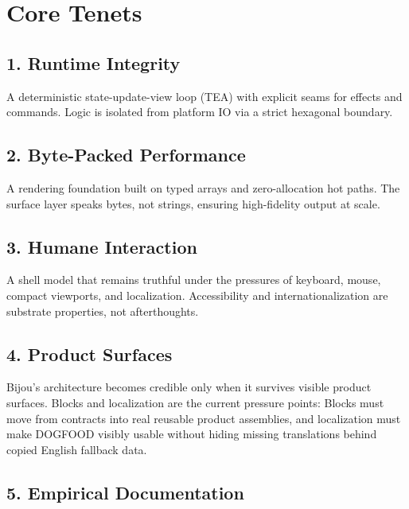 \section{Core Tenets}\label{record-031-core-tenets}

\subsection{1. Runtime Integrity}\label{record-031-runtime-integrity}

A deterministic state-update-view loop (TEA) with explicit seams for effects and commands. Logic is isolated from platform IO via a strict hexagonal boundary.

\subsection{2. Byte-Packed Performance}\label{record-031-byte-packed-performance}

A rendering foundation built on typed arrays and zero-allocation hot paths. The surface layer speaks bytes, not strings, ensuring high-fidelity output at scale.

\subsection{3. Humane Interaction}\label{record-031-humane-interaction}

A shell model that remains truthful under the pressures of keyboard, mouse, compact viewports, and localization. Accessibility and internationalization are substrate properties, not afterthoughts.

\subsection{4. Product Surfaces}\label{record-031-product-surfaces}

Bijou's architecture becomes credible only when it survives visible product surfaces. Blocks and localization are the current pressure points: Blocks must move from contracts into real reusable product assemblies, and localization must make DOGFOOD visibly usable without hiding missing translations behind copied English fallback data.

\subsection{5. Empirical Documentation}\label{record-031-empirical-documentation}

